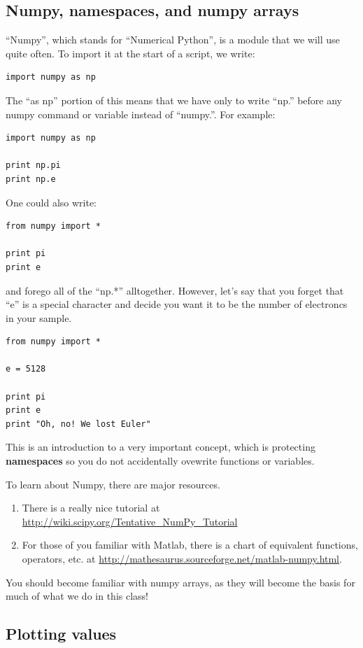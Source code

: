 \documentclass[a4paper,10pt]{scrartcl}
\begin{document}
\subsection{Numpy, namespaces, and numpy arrays}
\label{s:numpy}

``Numpy'', which stands for ``Numerical Python'', is a module that we will use quite often. To import it at the start of a script, we write:
\begin{lstlisting}
import numpy as np
\end{lstlisting}
The ``as np'' portion of this means that we have only to write ``np.'' before any numpy command or variable instead of ``numpy.''. For example:
\begin{lstlisting}
import numpy as np

print np.pi
print np.e
\end{lstlisting}

One could also write:
\begin{lstlisting}
from numpy import *

print pi
print e
\end{lstlisting}
and forego all of the ``np.*'' alltogether. However, let's say that you forget that ``e'' is a special character and decide you want it to be the number of electroncs in your sample.
\begin{lstlisting}
from numpy import *

e = 5128

print pi
print e
print "Oh, no! We lost Euler"
\end{lstlisting}
This is an introduction to a very important concept, which is protecting \textbf{namespaces} so you do not accidentally ovewrite functions or variables. 

To learn about Numpy, there are major resources.

\begin{enumerate}
 \item There is a really nice tutorial at \url{http://wiki.scipy.org/Tentative_NumPy_Tutorial}
 \item For those of you familiar with Matlab, there is a chart of equivalent functions, operators, etc. at \url{http://mathesaurus.sourceforge.net/matlab-numpy.html}.
\end{enumerate}

You should become familiar with numpy arrays, as they will become the basis for much of what we do in this class!

\subsection{Plotting values}
\end{document}
